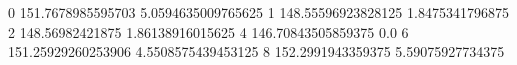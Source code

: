 0 151.7678985595703 5.0594635009765625
1 148.55596923828125 1.8475341796875
2 148.56982421875 1.86138916015625
4 146.70843505859375 0.0
6 151.25929260253906 4.5508575439453125
8 152.2991943359375 5.59075927734375
